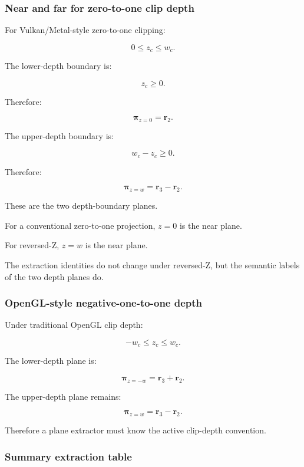 \subsubsection{Near and far for zero-to-one clip depth}\label{near-and-far-for-zero-to-one-clip-depth}

For Vulkan/Metal-style zero-to-one clipping:

\[
 0\le z_c\le w_c.
\]

The lower-depth boundary is:

\[
 z_c\ge0.
\]

Therefore:

\[
 \boxed{ \boldsymbol\pi_{z=0}=\mathbf r_2 }.
\]

The upper-depth boundary is:

\[
 w_c-z_c\ge0.
\]

Therefore:

\[
 \boxed{ \boldsymbol\pi_{z=w}=\mathbf r_3-\mathbf r_2 }.
\]

These are the two depth-boundary planes.

For a conventional zero-to-one projection, \(z=0\) is the near plane.

For reversed-Z, \(z=w\) is the near plane.

The extraction identities do not change under reversed-Z, but the semantic labels of the two depth planes do.

\subsubsection{OpenGL-style negative-one-to-one depth}\label{opengl-style-negative-one-to-one-depth}

Under traditional OpenGL clip depth:

\[
 -w_c\le z_c\le w_c.
\]

The lower-depth plane is:

\[
 \boxed{ \boldsymbol\pi_{z=-w}=\mathbf r_3+\mathbf r_2 }.
\]

The upper-depth plane remains:

\[
 \boxed{ \boldsymbol\pi_{z=w}=\mathbf r_3-\mathbf r_2 }.
\]

Therefore a plane extractor must know the active clip-depth convention.

\subsubsection{Summary extraction table}\label{summary-extraction-table}

